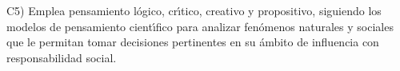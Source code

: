 C5) Emplea pensamiento l\'{o}gico, cr\'{\i}tico, creativo y propositivo,
siguiendo los modelos de pensamiento cient\'{\i}fico para analizar
fen\'{o}menos naturales y sociales que le permitan tomar decisiones
pertinentes en su \'{a}mbito de influencia con responsabilidad social.
